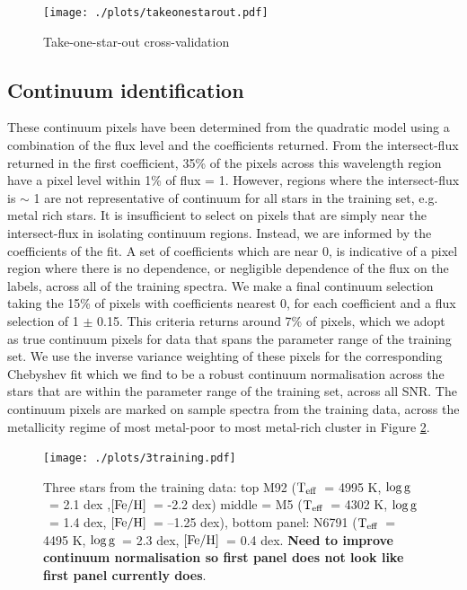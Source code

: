 \documentclass[12pt, preprint]{aastex}
\newcommand{\teff}{\mbox{$\rm T_{eff}$}}
\newcommand{\feh}{\mbox{$\rm [Fe/H]$}}
\newcommand{\logg}{\mbox{$\rm \log g$}}
\begin{document}
\begin{figure}[h!]
\centering
  \texttt{[image: ./plots/takeonestarout.pdf]}
\caption{Take-one-star-out cross-validation}
\label{fig:takeonestarout}
\end{figure}


\subsection{Continuum identification}



These continuum pixels have been determined from the quadratic model using a combination of the flux level and the coefficients returned.  From the intersect-flux returned in the first coefficient, 35\% of the pixels across this wavelength region have a pixel level within 1\% of flux = 1. However, regions where the intersect-flux is $\sim$ 1 are not representative of continuum for all stars in the training set, e.g. metal rich stars. It is insufficient to select on pixels that are simply near the intersect-flux in isolating continuum regions. Instead, we are informed by the coefficients of the fit. A set of coefficients which are near 0, is indicative of a pixel region where there is no dependence, or negligible dependence of the flux on the labels, across all of the training spectra. We make a final continuum selection taking the 15\% of pixels with coefficients nearest 0, for each coefficient and a flux selection of 1 $\pm$ 0.15. This criteria returns around  7\% of pixels, which we adopt as true continuum pixels for data that spans the parameter range of the training set. We use the inverse variance weighting of these pixels for the corresponding Chebyshev fit which we find to be a robust continuum normalisation across the stars that are within the parameter range of the training set, across all SNR. The continuum pixels are marked on sample spectra from the training data, across the metallicity regime of most metal-poor to most metal-rich cluster in Figure \ref{fig:cal_feh}.


\begin{figure}[h!]
  \texttt{[image: ./plots/3training.pdf]}
\caption{Three stars from the training data: top M92 (\teff\ = 4995 K, \logg\ = 2.1 dex ,\feh\, = -2.2 dex) middle = M5 (\teff\ = 4302 K, \logg\ = 1.4 dex, \feh\ = --1.25 dex), bottom panel: N6791 (\teff\  = 4495 K, \logg\ = 2.3 dex, \feh\ = 0.4 dex. \textbf{Need to improve continuum normalisation so first panel does not look like first panel currently does}. }
\label{fig:cal_feh}
\end{figure}
\end{document}
